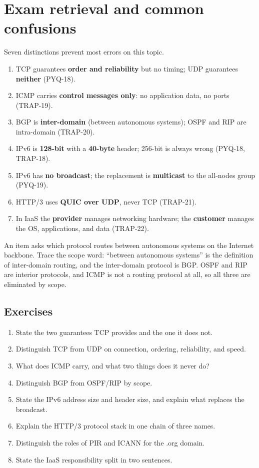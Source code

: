 \section{Exam retrieval and common confusions}
Seven distinctions prevent most errors on this topic.
\begin{enumerate}
  \item TCP guarantees \textbf{order and reliability} but no timing; UDP
    guarantees \textbf{neither} (PYQ-18).
  \item ICMP carries \textbf{control messages only}: no application data, no
    ports (TRAP-19).
  \item BGP is \textbf{inter-domain} (between autonomous systems); OSPF and
    RIP are intra-domain (TRAP-20).
  \item IPv6 is \textbf{128-bit} with a \textbf{40-byte} header; 256-bit is
    always wrong (PYQ-18, TRAP-18).
  \item IPv6 has \textbf{no broadcast}; the replacement is
    \textbf{multicast} to the all-nodes group (PYQ-19).
  \item HTTP/3 uses \textbf{QUIC over UDP}, never TCP (TRAP-21).
  \item In IaaS the \textbf{provider} manages networking hardware; the
    \textbf{customer} manages the OS, applications, and data (TRAP-22).
\end{enumerate}

\begin{example}
An item asks which protocol routes between autonomous systems on the
Internet backbone. Trace the scope word: ``between autonomous systems'' is
the definition of inter-domain routing, and the inter-domain protocol is BGP.
OSPF and RIP are interior protocols, and ICMP is not a routing protocol at
all, so all three are eliminated by scope.
\end{example}

\subsection*{Exercises}
\begin{enumerate}[label=\arabic*.]
  \item State the two guarantees TCP provides and the one it does not.
  \item Distinguish TCP from UDP on connection, ordering, reliability, and
    speed.
  \item What does ICMP carry, and what two things does it never do?
  \item Distinguish BGP from OSPF/RIP by scope.
  \item State the IPv6 address size and header size, and explain what replaces
    the broadcast.
  \item Explain the HTTP/3 protocol stack in one chain of three names.
  \item Distinguish the roles of PIR and ICANN for the .org domain.
  \item State the IaaS responsibility split in two sentences.
\end{enumerate}

